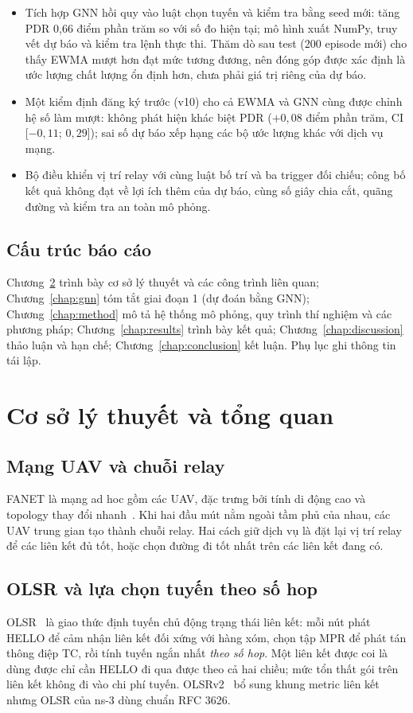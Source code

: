 \documentclass[12pt,a4paper]{report}
\begin{document}
\begin{itemize}
  \item Tích hợp GNN hồi quy vào luật chọn tuyến và kiểm tra bằng seed mới: tăng PDR 0,66 điểm phần trăm so với số đo hiện tại; mô hình xuất NumPy, truy vết dự báo và kiểm tra lệnh thực thi. Thăm dò sau test (200 episode mới) cho thấy EWMA mượt hơn đạt mức tương đương, nên đóng góp được xác định là ước lượng chất lượng ổn định hơn, chưa phải giá trị riêng của dự báo.
  \item Một kiểm định đăng ký trước (v10) cho cả EWMA và GNN cùng được chỉnh hệ số làm mượt: không phát hiện khác biệt PDR ($+0{,}08$ điểm phần trăm, CI [$-0{,}11$; $0{,}29$]); sai số dự báo xếp hạng các bộ ước lượng khác với dịch vụ mạng.
  \item Bộ điều khiển vị trí relay với cùng luật bố trí và ba trigger đối chiếu; công bố kết quả không đạt về lợi ích thêm của dự báo, cùng số giây chia cắt, quãng đường và kiểm tra an toàn mô phỏng.
\end{itemize}

\section{Cấu trúc báo cáo}
Chương~\ref{chap:background} trình bày cơ sở lý thuyết và các công trình liên quan; Chương~\ref{chap:gnn} tóm tắt giai đoạn 1 (dự đoán bằng GNN); Chương~\ref{chap:method} mô tả hệ thống mô phỏng, quy trình thí nghiệm và các phương pháp; Chương~\ref{chap:results} trình bày kết quả; Chương~\ref{chap:discussion} thảo luận và hạn chế; Chương~\ref{chap:conclusion} kết luận. Phụ lục ghi thông tin tái lập.

\chapter{Cơ sở lý thuyết và tổng quan}\label{chap:background}
\section{Mạng UAV và chuỗi relay}
FANET là mạng ad hoc gồm các UAV, đặc trưng bởi tính di động cao và topology thay đổi nhanh~\cite{bekmezci}. Khi hai đầu mút nằm ngoài tầm phủ của nhau, các UAV trung gian tạo thành chuỗi relay. Hai cách giữ dịch vụ là đặt lại vị trí relay để các liên kết đủ tốt, hoặc chọn đường đi tốt nhất trên các liên kết đang có.

\section{OLSR và lựa chọn tuyến theo số hop}
OLSR~\cite{rfc3626} là giao thức định tuyến chủ động trạng thái liên kết: mỗi nút phát HELLO để cảm nhận liên kết đối xứng với hàng xóm, chọn tập MPR để phát tán thông điệp TC, rồi tính tuyến ngắn nhất \emph{theo số hop}. Một liên kết được coi là dùng được chỉ cần HELLO đi qua được theo cả hai chiều; mức tổn thất gói trên liên kết không đi vào chi phí tuyến. OLSRv2~\cite{rfc7181} bổ sung khung metric liên kết nhưng OLSR của ns-3 dùng chuẩn RFC 3626.
\end{document}
